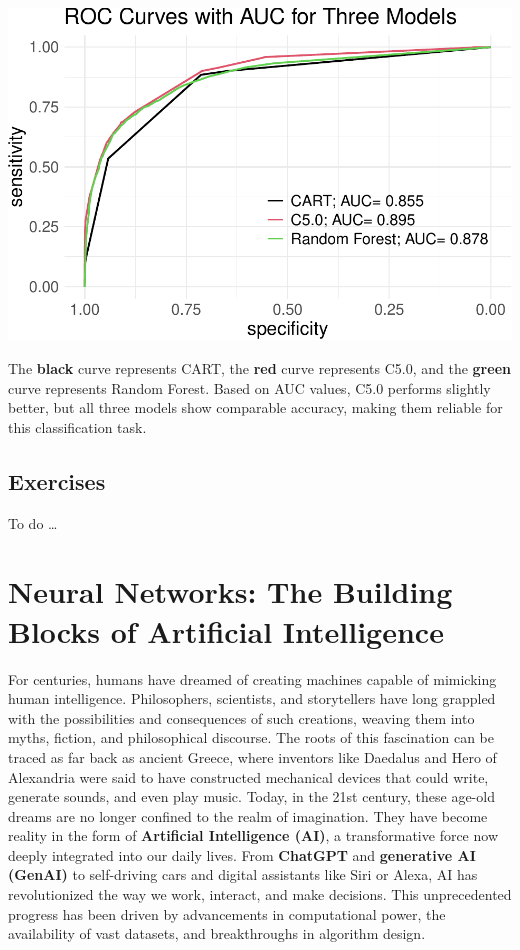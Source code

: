 \documentclass[
]{book}
\theoremstyle{definition}
\theoremstyle{definition}
\theoremstyle{definition}
\theoremstyle{definition}
\theoremstyle{remark}
\begin{document}
\begin{center}\includegraphics{tree_files/figure-latex/unnamed-chunk-14-1} \end{center}

The \textbf{black} curve represents CART, the {\textbf{red}} curve represents C5.0, and the {\textbf{green}} curve represents Random Forest. Based on AUC values, C5.0 performs slightly better, but all three models show comparable accuracy, making them reliable for this classification task.

\section{Exercises}\label{exercises-6}

To do \ldots{}

\chapter{Neural Networks: The Building Blocks of Artificial Intelligence}\label{chapter-nn}

For centuries, humans have dreamed of creating machines capable of mimicking human intelligence. Philosophers, scientists, and storytellers have long grappled with the possibilities and consequences of such creations, weaving them into myths, fiction, and philosophical discourse. The roots of this fascination can be traced as far back as ancient Greece, where inventors like Daedalus and Hero of Alexandria were said to have constructed mechanical devices that could write, generate sounds, and even play music. Today, in the 21st century, these age-old dreams are no longer confined to the realm of imagination. They have become reality in the form of \textbf{Artificial Intelligence (AI)}, a transformative force now deeply integrated into our daily lives. From \textbf{ChatGPT} and \textbf{generative AI (GenAI)} to self-driving cars and digital assistants like Siri or Alexa, AI has revolutionized the way we work, interact, and make decisions. This unprecedented progress has been driven by advancements in computational power, the availability of vast datasets, and breakthroughs in algorithm design.
\end{document}
